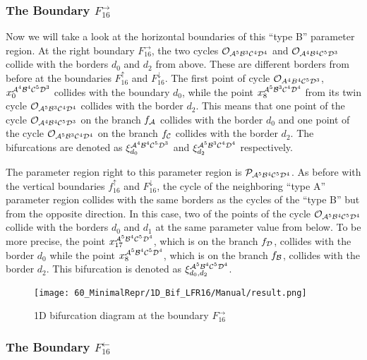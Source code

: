 \subsubsection{The Boundary $F_{16}^\rightarrow$}
\label{sec:minrep.bif.R}

Now we will take a look at the horizontal boundaries of this ``type B'' parameter region.
At the right boundary $F_{16}^\rightarrow$, the two cycles $\mathcal{O}_{\mathcal{A}^5\mathcal{B}^3\mathcal{C}^4\mathcal{D}^4}$ and $\mathcal{O}_{\mathcal{A}^4\mathcal{B}^4\mathcal{C}^5\mathcal{D}^3}$ collide with the borders $d_0$ and $d_2$ from above.
These are different borders from before at the boundaries $F_{16}^\uparrow$ and $F_{16}^\downarrow$.
The first point of cycle $\mathcal{O}_{A^4B^4\mathcal{C}^5\mathcal{D}^3}$, $x_{0}^{\mathcal{A}^4\mathcal{B}^4\mathcal{C}^5\mathcal{D}^3}$ collides with the boundary $d_0$, while the point $x_{8}^{\mathcal{A}^5\mathcal{B}^3\mathcal{C}^4\mathcal{D}^4}$ from its twin cycle $\mathcal{O}_{\mathcal{A}^5\mathcal{B}^3\mathcal{C}^4\mathcal{D}^4}$ collides with the border $d_2$.
This means that one point of the cycle $\mathcal{O}_{\mathcal{A}^4\mathcal{B}^4\mathcal{C}^5\mathcal{D}^3}$ on the branch $f_{\mathcal{A}}$ collides with the border $d_0$ and one point of the cycle $\mathcal{O}_{\mathcal{A}^5\mathcal{B}^3\mathcal{C}^4\mathcal{D}^4}$ on the branch $f_{\mathcal{C}}$ collides with the border $d_2$.
The bifurcations are denoted as $\xi_{d_0}^{\mathcal{A}^4\mathcal{B}^4\mathcal{C}^5\mathcal{D}^3}$ and $\xi_{d_2}^{\mathcal{A}^5\mathcal{B}^3\mathcal{C}^4\mathcal{D}^4}$ respectively.

The parameter region right to this parameter region is $\mathcal{P}_{\mathcal{A}^5\mathcal{B}^4\mathcal{C}^5\mathcal{D}^4}$.
As before with the vertical boundaries $f_{16}^\uparrow$ and $F_{16}^\downarrow$, the cycle of the neighboring ``type A'' parameter region collides with the same borders as the cycles of the ``type B'' but from the opposite direction.
In this case, two of the points of the cycle $\mathcal{O}_{\mathcal{A}^5\mathcal{B}^4\mathcal{C}^5\mathcal{D}^4}$ collide with the borders $d_0$ and $d_1$ at the same parameter value from below.
To be more precise, the point $x_{17}^{\mathcal{A}^5\mathcal{B}^4\mathcal{C}^5\mathcal{D}^4}$, which is on the branch $f_{\mathcal{D}}$, collides with the border $d_0$ while the point $x_{8}^{\mathcal{A}^5\mathcal{B}^4\mathcal{C}^5\mathcal{D}^4}$, which is on the branch $f_{\mathcal{B}}$, collides with the border $d_2$.
This bifurcation is denoted as $\xi_{d_0, d_2}^{\mathcal{A}^5\mathcal{B}^4\mathcal{C}^5\mathcal{D}^4}$.

\begin{figure}
    \centering
    \texttt{[image: 60\_MinimalRepr/1D\_Bif\_LFR16/Manual/result.png]}
    \label{fig:final.bifurcation.F.right}
    \caption{1D bifurcation diagram at the boundary $F_{16}^\rightarrow$}
\end{figure}

\subsubsection{The Boundary $F_{16}^\leftarrow$}
\label{sec:minrep.bif.L}

